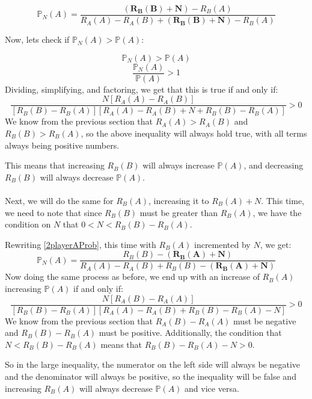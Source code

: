 \documentclass[english,12pt,a4paper,final]{article}
\begin{document}
\begin{equation*}
	\mathbb{P}_N(A)=\frac{\boldsymbol{(R_B(B)+N)}-R_B(A)}{R_A(A)-R_A(B)+\boldsymbol{(R_B(B)+N)}-R_B(A)}
\end{equation*}

Now, lets check if $\mathbb{P}_N(A) > \mathbb{P}(A)$:

\begin{equation*}
	\mathbb{P}_N(A) > \mathbb{P}(A)
\end{equation*}
\begin{equation*}
	\frac{\mathbb{P}_N(A)}{\mathbb{P}(A)} > 1
\end{equation*}
Dividing, simplifying, and factoring, we get that this is true if and only if:
\begin{equation*}
	\frac{N\left[R_A(A)-R_A(B)\right]}{\left[R_B(B)-R_B(A)\right]\left[R_A(A)-R_A(B)+N+R_B(B)-R_B(A)\right]} > 0
\end{equation*}
We know from the previous section that $R_A(A) > R_A(B)$ and $R_B(B) > R_B(A)$, so the above inequality will always hold true, with all terms always being positive numbers.

This means that increasing $R_B(B)$ will always increase $\mathbb{P}(A)$, and decreasing $R_B(B)$ will always decrease $\mathbb{P}(A)$.
\\\\
Next, we will do the same for $R_B(A)$, increasing it to $R_B(A)+N$. This time, we need to note that since $R_B(B)$ must be greater than $R_B(A)$, we have the condition on $N$ that $0 < N < R_B(B)-R_B(A)$.

Rewriting \eqref{2playerAProb}, this time with $R_B(A)$ incremented by $N$, we get:
\begin{equation*}
	\mathbb{P}_N(A) = \frac{R_B(B)-\boldsymbol{(R_B(A)+N)}}{R_A(A)-R_A(B)+R_B(B)-\boldsymbol{(R_B(A)+N)}}
\end{equation*}
Now doing the same process as before, we end up with an increase of $R_B(A)$ increasing $\mathbb{P}(A)$ if and only if:
\begin{equation*}
	\frac{N\left[R_A(B)-R_A(A)\right]}{\left[R_B(B)-R_B(A)\right]\left[R_A(A)-R_A(B)+R_B(B)-R_B(A)-N\right]} > 0
\end{equation*}
We know from the previous section that $R_A(B)-R_A(A)$ must be negative and $R_B(B)-R_B(A)$ must be positive. Additionally, the condition that $N < R_B(B)-R_B(A)$ means that $R_B(B)-R_B(A)-N > 0$.

So in the large inequality, the numerator on the left side will always be negative and the denominator will always be positive, so the inequality will be false and increasing $R_B(A)$ will always decrease $\mathbb{P}(A)$ and vice versa.
\end{document}
